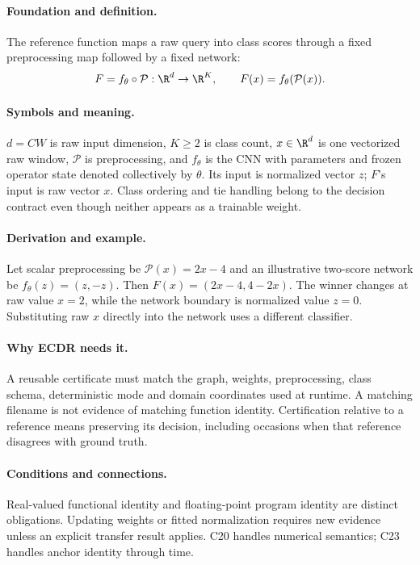 \paragraph{Foundation and definition.}
The reference function maps a raw query into class scores through a fixed
preprocessing map followed by a fixed network:
\[
 F=f_\theta\circ\mathcal P:\R^d\to\R^K,
 \qquad F(x)=f_\theta(\mathcal P(x)).
\]
\paragraph{Symbols and meaning.}
$d=CW$ is raw input dimension, $K\ge2$ is class count,
$x\in\R^d$ is one vectorized raw window, $\mathcal P$ is preprocessing,
and $f_\theta$ is the CNN with parameters and frozen operator state
denoted collectively by $\theta$. Its input is normalized vector $z$;
$F$'s input is raw vector $x$. Class ordering and tie handling belong to
the decision contract even though neither appears as a trainable weight.
\paragraph{Derivation and example.}
Let scalar preprocessing be $\mathcal P(x)=2x-4$ and an illustrative
two-score network be $f_\theta(z)=(z,-z)$. Then
$F(x)=(2x-4,4-2x)$. The winner changes at raw value $x=2$, while the
network boundary is normalized value $z=0$. Substituting raw $x$ directly
into the network uses a different classifier.
\paragraph{Why ECDR needs it.}
A reusable certificate must match the graph, weights, preprocessing,
class schema, deterministic mode and domain coordinates used at runtime.
A matching filename is not evidence of matching function identity.
Certification relative to a reference means preserving its decision,
including occasions when that reference disagrees with ground truth.
\paragraph{Conditions and connections.}
Real-valued functional identity and floating-point program identity are
distinct obligations. Updating weights or fitted normalization requires
new evidence unless an explicit transfer result applies. C20 handles
numerical semantics; C23 handles anchor identity through time.

